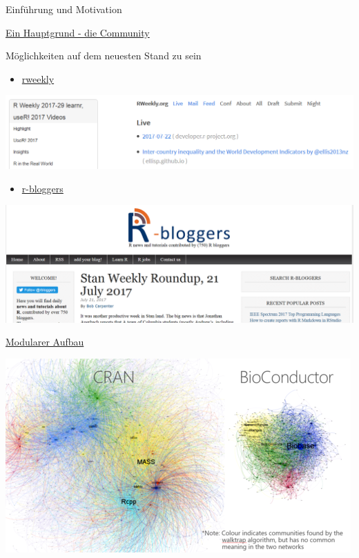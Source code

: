 \documentclass[ignorenonframetext,]{beamer}
\providecommand{\tightlist}{%
\setlength{\itemsep}{0pt}\setlength{\parskip}{0pt}}
\begin{document}
\begin{frame}[fragile]{Einführung und Motivation}
\begin{block}{\href{http://blog.revolutionanalytics.com/2017/06/r-community.html}{Ein
Hauptgrund - die Community}}
\end{block}

\begin{block}{Möglichkeiten auf dem neuesten Stand zu sein}

\begin{itemize}
\tightlist
\item
  \href{https://rweekly.org/}{rweekly}
\end{itemize}

\includegraphics{./tex2pdf.9796/d55db1fd3fe6749394b00af902ed3e5b81e8f49e.png}

\begin{itemize}
\tightlist
\item
  \href{https://www.r-bloggers.com/}{r-bloggers}
\end{itemize}

\includegraphics{./tex2pdf.9796/76b89ea071e6ca673619294a009d8946ed81de59.png}

\end{block}

\begin{block}{\href{http://stats.idre.ucla.edu/r/seminars/intro/}{Modularer
Aufbau}}

\includegraphics{./tex2pdf.9796/52aa3feffd0fea76fab89e494b422bd484e53778.png}


\end{block}
\end{frame}
\end{document}
